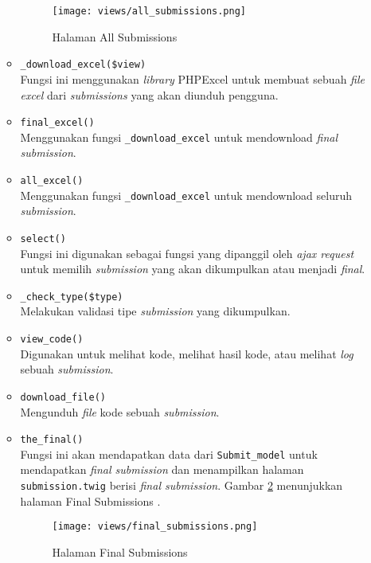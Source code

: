 \begin{itemize}
\begin{itemize}
		            \begin{figure}[H]
			            \centering
			            \texttt{[image: views/all\_submissions.png]}
			            \caption{Halaman All Submissions}
			            \label{fig:3:1:1:all}
		            \end{figure}
		      \item \verb|_download_excel($view)| \\
		            Fungsi ini menggunakan \textit{library} PHPExcel untuk membuat sebuah \textit{file excel} dari \textit{submissions} yang akan diunduh pengguna.
		      \item \verb|final_excel()| \\
		            Menggunakan fungsi \verb|_download_excel| untuk mendownload \textit{final submission}.
		      \item \verb|all_excel()| \\
		            Menggunakan fungsi \verb|_download_excel| untuk mendownload seluruh \textit{submission}.
		      \item \verb|select()| \\
		            Fungsi ini digunakan sebagai fungsi yang dipanggil oleh \textit{ajax request} untuk memilih \textit{submission} yang akan dikumpulkan atau menjadi \textit{final}.
		      \item \verb|_check_type($type)| \\
		            Melakukan validasi tipe \textit{submission} yang dikumpulkan.
		      \item \verb|view_code()| \\
		            Digunakan untuk melihat kode, melihat hasil kode, atau melihat \textit{log} sebuah \textit{submission}.
		      \item \verb|download_file()| \\
		            Mengunduh \textit{file} kode sebuah \textit{submission}.
		      \item \verb|the_final()| \\
		            Fungsi ini akan mendapatkan data dari \verb|Submit_model| untuk mendapatkan \textit{final submission} dan menampilkan halaman \verb|submission.twig| berisi \textit{final submission}. Gambar \ref{fig:3:1:1:final} menunjukkan halaman Final Submissions .
		            \begin{figure}[H]
			            \centering
			            \texttt{[image: views/final\_submissions.png]}
			            \caption{Halaman Final Submissions}
			            \label{fig:3:1:1:final}
		            \end{figure}
	      \end{itemize}


\end{itemize}
